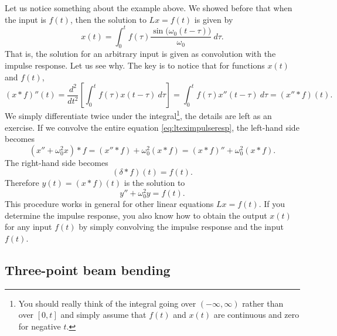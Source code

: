 Let us notice something about the example above.  We showed before that
when the input is $f(t)$, then the solution to $Lx = f(t)$
is given by
\begin{equation*}
x(t) = 
\int_0^t
f(\tau) 
\frac{\sin \bigl( \omega_0 (t-\tau) \bigr)}{\omega_0} ~ d\tau .
\end{equation*}
That is, the solution for an arbitrary input is given as
convolution with the impulse response.  Let us see why.
The key is to notice that for functions $x(t)$ and $f(t)$,
\begin{equation*}
(x * f)''(t) =
\frac{d^2}{dt^2}\left[
\int_0^t
f(\tau) 
x(t-\tau) ~ d\tau \right]
=
\int_0^t
f(\tau) 
x''(t-\tau) ~ d\tau
= (x'' * f)(t) .
\end{equation*}
We simply differentiate twice under the
integral\footnote{You should really think of the integral going over
$(-\infty,\infty)$ rather than over $[0,t]$ and simply assume that $f(t)$ and
$x(t)$ are continuous and zero for negative $t$.}, the details are
left as an exercise.
If we convolve the entire equation \eqref{eq:lteximpulseresp},
the left-hand side becomes
\begin{equation*}
(x'' + \omega_0^2 x) * f =
(x'' * f) + \omega_0^2 (x * f) =
(x * f)'' + \omega_0^2 (x * f) .
\end{equation*}
The right-hand side becomes
\begin{equation*}
(\delta * f)(t) = f(t).
\end{equation*}
Therefore $y(t) = (x * f)(t)$ is the solution to
\begin{equation*}
y'' + \omega_0^2 y = f(t) .
\end{equation*}
This procedure works in general for other linear
equations $Lx = f(t)$.  If you determine the impulse response,
you also know how to obtain the output $x(t)$ for any input $f(t)$
by simply convolving
the impulse response and the input $f(t)$.

\subsection{Three-point beam bending}

